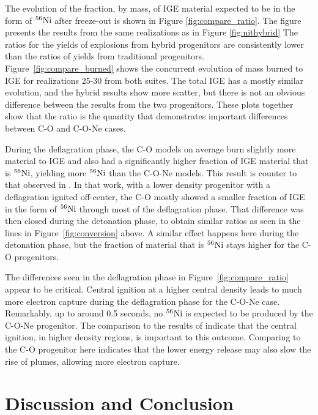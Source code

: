 \documentclass[preprint2]{aastex63}
\newcommand{\Ni}[1]{\ensuremath{{}^{#1}{\rm Ni}}}
\begin{document}
{\color{blue} 
The evolution of the fraction, by mass, of IGE material expected to be in the form of \Ni{56} after 
freeze-out is shown in Figure \ref{fig:compare_ratio}. The figure presents the results from the
same realizations as in Figure \ref{fig:nithybrid} The ratios for the yields of 
explosions from hybrid progenitors are consistently lower than the ratios of yields from
traditional progenitors.
Figure~\ref{fig:compare_burned} shows the 
concurrent evolution of mass burned to IGE for realizations 25-30 from both suites.
The total IGE has a mostly similar evolution, and the hybrid results show
more scatter, but there is not an obvious difference between the results from
the two progenitors. These plots together show that the 
ratio is the quantity that demonstrates important differences between 
C-O and C-O-Ne cases.
}

During the deflagration phase, the C-O models
on average burn slightly more material to IGE and also had a significantly higher
fraction of IGE material that is \Ni{56}, yielding more \Ni{56} than
the C-O-Ne models. This result is counter to that observed in
\citet{willcoxetal2016}.
In that work, with a lower density progenitor with a deflagration ignited off-center, the C-O mostly showed a smaller fraction of IGE in the form of \Ni{56} through most of the deflagration phase.
That difference was then closed during the detonation phase, to obtain similar ratios as seen in the lines in Figure~\ref{fig:conversion} above.
A similar effect happens here during the detonation phase, but the fraction of material that is \Ni{56} stays higher for the C-O progenitors.

The differences seen in the deflagration phase in Figure~\ref{fig:compare_ratio} appear to be critical.
Central ignition at a higher central density leads to much more electron capture during the deflagration phase for the C-O-Ne case.
Remarkably, up to around 0.5 seconds, no \Ni{56} is expected to be produced by the C-O-Ne progenitor.
The comparison to the results of \citep{willcoxetal2016} indicate that the central ignition, in higher density regions, is important to this outcome.
Comparing to the C-O progenitor here indicates that the lower energy release may also slow the rise of plumes, allowing more electron capture.

\section{Discussion and Conclusion}
\end{document}
